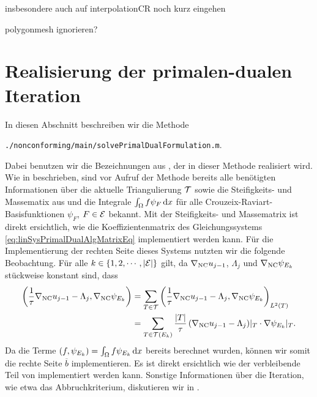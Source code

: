 insbesondere auch auf interpolationCR noch kurz eingehen

\bigskip polygonmesh ignorieren? 


\section{Realisierung der primalen-dualen Iteration}
\label{sec:implementationPrimalDualIteration}
In diesen Abschnitt beschreiben wir die Methode
\begin{center}
  \texttt{./nonconforming/main/solvePrimalDualFormulation.m}.
\end{center}
Dabei benutzen wir die Bezeichnungen aus , der
in dieser Methode realisiert wird.
Wie in  beschrieben, sind vor Aufruf der Methode bereits
alle benötigten Informationen über die aktuelle Triangulierung $\mathcal{T}$
sowie die Steifig\-keits- und Massematix aus 
und die Integrale $\int_\Omega f\psi_F\,\mathrm{d}x$ für alle
Crouzeix-Raviart-Basisfunktionen $\psi_F$, $F\in\mathcal{E}$ bekannt.
Mit der Steifigkeits- und Massematrix ist direkt ersichtlich,
wie die Koeffizientenmatrix des Gleichungssystems
\eqref{eq:linSysPrimalDualAlgMatrixEq} implementiert werden kann.
Für die Implementierung der rechten Seite dieses Systems nutzten wir die
folgende Beobachtung.
Für alle $k\in\{1,2,\cdots,|\mathcal{E}|\}$ gilt, da $\nabla_\textup{NC} u_{j-1}$,
$\Lambda_j$ und $\nabla_\textup{NC} \psi_{E_k}$ stückweise konstant sind, dass
\begin{align*}
  \left(\frac{1}{\tau}\nabla_\textup{NC} u_{j-1}-\Lambda_j,\nabla_\textup{NC}\psi_{E_k}\right)
  &=
  \sum_{T\in\mathcal{T}}
  \left(\frac{1}{\tau}\nabla_\textup{NC} u_{j-1}-\Lambda_j,
  \nabla_\textup{NC}\psi_{E_k}\right)_{L^2(T)}\\
  &=
  \sum_{T\in\mathcal{T}(E_k)}
  \frac{|T|}{\tau}\left(\nabla_\textup{NC} u_{j-1}-\Lambda_j\right)\!|_T\cdot
  \nabla\psi_{E_k}|_T.
\end{align*}
Da die Terme $\left(f,\psi_{E_k}\right)=\int_\Omega f\psi_{E_k}\,\mathrm{d}x$ bereits
berechnet wurden, können wir somit die rechte Seite $\overline b$
implementieren.
Es ist direkt ersichtlich wie der verbleibende Teil von
 implementiert werden kann.
Sonstige Informationen über die Iteration, wie etwa das Abbruchkriterium,
diskutieren wir in .

